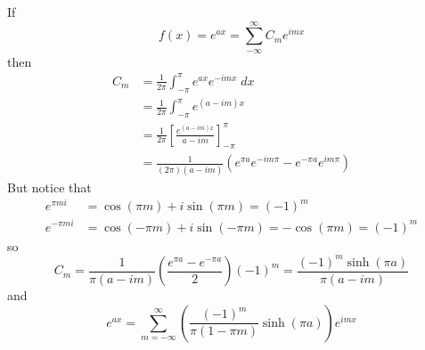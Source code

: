 \documentclass[12pt]{article}
\begin{document}
\color{blue}
If 
\[f(x) = e^{ax} = \sum_{-\infty}^\infty C_m e^{imx}\]
then 
\begin{align*}
    C_m &= \frac{1}{2\pi}\int_{-\pi}^\pi e^{ax} e^{-imx} \; dx\\
    &=\frac{1}{2\pi}\int_{-\pi}^\pi e^{(a- im)x}\\
    &=\frac{1}{2\pi}\left[\frac{e^{(a- im)x}}{a - im}\right]_{-\pi}^\pi\\
    &= \frac{1}{(2\pi)(a- im)} \left(e^{\pi a}e^{-im\pi} - e^{-\pi a} e^{im\pi}\right)
\end{align*}
But notice that 
\begin{align*}
    e^{\pi mi} &= \cos(\pi m) + i\sin(\pi m) = (-1)^m\\
    e^{-\pi mi} &= \cos(-\pi m) + i\sin(-\pi m) = -\cos(\pi m) = (-1)^m
\end{align*}
so 
\[C_m = \frac{1}{\pi(a- im)} \left(\frac{e^{\pi a}- e^{-\pi a}}{2}\right)(-1)^m = \frac{(-1)^m \sinh(\pi a)}{\pi(a - im)}\]
and 
\[\boxed{e^{ax} = \sum_{m=-\infty}^\infty \left(\frac{(-1)^m}{\pi(1 - \pi m)}\sinh(\pi a)\right)e^{imx}}\]
\end{document}

